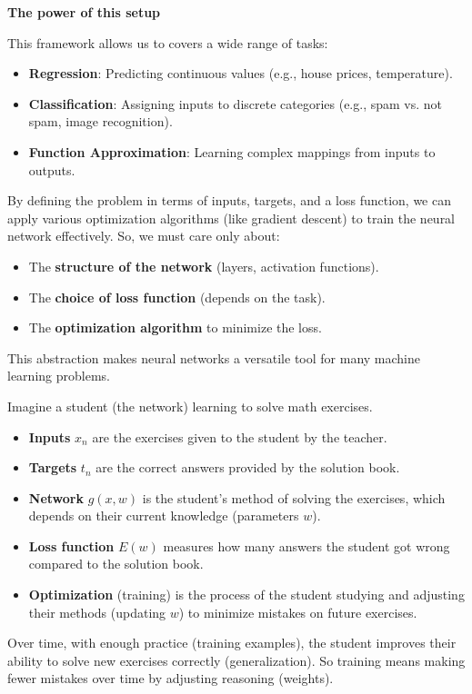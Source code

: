\newpage

\begin{flushleft}
    \textcolor{Green3}{ \textbf{The power of this setup}}
\end{flushleft}
This framework allows us to covers a wide range of tasks:
\begin{itemize}
    \item \textbf{Regression}: Predicting continuous values (e.g., house prices, temperature).
    \item \textbf{Classification}: Assigning inputs to discrete categories (e.g., spam vs. not spam, image recognition).
    \item \textbf{Function Approximation}: Learning complex mappings from inputs to outputs.
\end{itemize}
By defining the problem in terms of inputs, targets, and a loss function, we can apply various optimization algorithms (like gradient descent) to train the neural network effectively. So, we must care only about:
\begin{itemize}
    \item The \textbf{structure of the network} (layers, activation functions).
    \item The \textbf{choice of loss function} (depends on the task).
    \item The \textbf{optimization algorithm} to minimize the loss.
\end{itemize}
This abstraction makes neural networks a versatile tool for many machine learning problems.

\begin{examplebox}[: Analogy]
    Imagine a student (the network) learning to solve math exercises.
    \begin{itemize}
        \item \textbf{Inputs} $x_{n}$ are the exercises given to the student by the teacher.
        \item \textbf{Targets} $t_{n}$ are the correct answers provided by the solution book.
        \item \textbf{Network} $g(x, w)$ is the student's method of solving the exercises, which depends on their current knowledge (parameters $w$).
        \item \textbf{Loss function} $E(w)$ measures how many answers the student got wrong compared to the solution book.
        \item \textbf{Optimization} (training) is the process of the student studying and adjusting their methods (updating $w$) to minimize mistakes on future exercises.
    \end{itemize}
    Over time, with enough practice (training examples), the student improves their ability to solve new exercises correctly (generalization). So training means making fewer mistakes over time by adjusting reasoning (weights).
\end{examplebox}